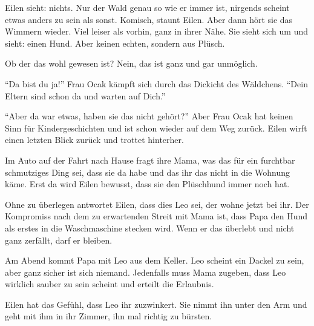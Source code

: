 Eilen sieht: nichts. Nur der Wald genau so wie er immer ist, nirgends scheint etwas anders zu sein als sonst. Komisch, staunt Eilen. Aber dann hört sie das Wimmern wieder. Viel leiser als vorhin, ganz in ihrer Nähe. Sie sieht sich um und sieht: einen Hund. Aber keinen echten, sondern aus Plüsch. 

Ob der das wohl gewesen ist? Nein, das ist ganz und gar unmöglich. 

\enquote{Da bist du ja!} Frau Ocak kämpft sich durch das Dickicht des Wäldchens. \enquote{Dein Eltern sind schon da und warten auf Dich.}

\enquote{Aber da war etwas, haben sie das nicht gehört?} Aber Frau Ocak hat keinen Sinn für Kindergeschichten und ist schon wieder auf dem Weg zurück. Eilen wirft einen letzten Blick zurück und trottet hinterher.

Im Auto auf der Fahrt nach Hause fragt ihre Mama, was das für ein furchtbar schmutziges Ding sei, dass sie da habe und das ihr das nicht in die Wohnung käme. Erst da wird Eilen bewusst, dass sie den Plüschhund immer noch hat. 

Ohne zu überlegen antwortet Eilen, dass dies Leo sei, der wohne jetzt bei ihr. Der Kompromiss nach dem zu erwartenden Streit mit Mama ist, dass Papa den Hund als erstes in die Waschmaschine stecken wird. Wenn er das überlebt und nicht ganz zerfällt, darf er bleiben.

Am Abend kommt Papa mit Leo aus dem Keller. Leo scheint ein Dackel zu sein, aber ganz sicher ist sich niemand. Jedenfalls muss Mama zugeben, dass Leo wirklich sauber zu sein scheint und erteilt die Erlaubnis.

Eilen hat das Gefühl, dass Leo ihr zuzwinkert. Sie nimmt ihn unter den Arm und geht mit ihm in ihr Zimmer, ihn mal richtig zu bürsten.








\vfill
